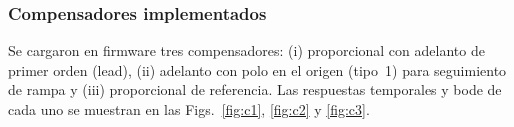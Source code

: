 \subsubsection{Compensadores implementados}
Se cargaron en firmware tres compensadores: (i) proporcional con adelanto de primer orden (lead), (ii) adelanto con polo en el origen (tipo~1) para seguimiento de rampa y (iii) proporcional de referencia. Las respuestas temporales y bode de cada uno se muestran en las Figs.~\ref{fig:c1}, \ref{fig:c2} y \ref{fig:c3}.


